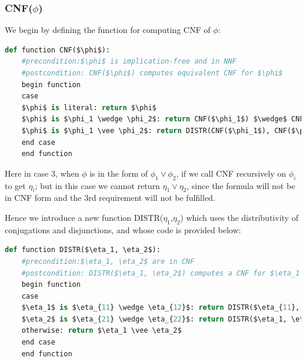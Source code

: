 \documentclass{report}
\begin{document}
\subsubsection{CNF($\phi$)}
We begin by defining the function for computing CNF of $\phi$:\\
\begin{lstlisting}[language=Python]
def function CNF($\phi$):
    #precondition:$\phi$ is implication-free and in NNF
    #postcondition: CNF($\phi$) computes equivalent CNF for $\phi$
    begin function
    case
    $\phi$ is literal: return $\phi$
    $\phi$ is $\phi_1 \wedge \phi_2$: return CNF($\phi_1$) $\wedge$ CNF($\phi_2$)
    $\phi$ is $\phi_1 \vee \phi_2$: return DISTR(CNF($\phi_1$), CNF($\phi_2$))
    end case
    end function
\end{lstlisting}
Here in case 3, when $\phi$ is in the form of $\phi_1 \vee \phi_2$, if we call CNF recursively on $\phi_i$ to get $\eta_i$; but in this case we cannot return $\eta_1 \vee \eta_2$, since the formula will not be in CNF form and the 3rd requirement will not be fulfilled. \\
\par
Hence we introduce a new function DISTR($\eta_1$,$\eta_2$) which uses the distributivity of conjugations and disjunctions, and whose code is provided below: \\
\begin{lstlisting}[language=Python]
def function DISTR($\eta_1, \eta_2$):
    #precondition:$\eta_1, \eta_2$ are in CNF
    #postcondition: DISTR($\eta_1, \eta_2$) computes a CNF for $\eta_1 \vee \eta_2$
    begin function
    case
    $\eta_1$ is $\eta_{11} \wedge \eta_{12}$: return DISTR($\eta_{11}, \eta_2$) $\wedge$ DISTR($\eta_{12}, \eta_2$) 
    $\eta_2$ is $\eta_{21} \wedge \eta_{22}$: return DISTR($\eta_1, \eta_{21}$) $\wedge$ DISTR($\eta_1, \eta_{22}$) 
    otherwise: return $\eta_1 \vee \eta_2$
    end case
    end function
\end{lstlisting}
\end{document}
